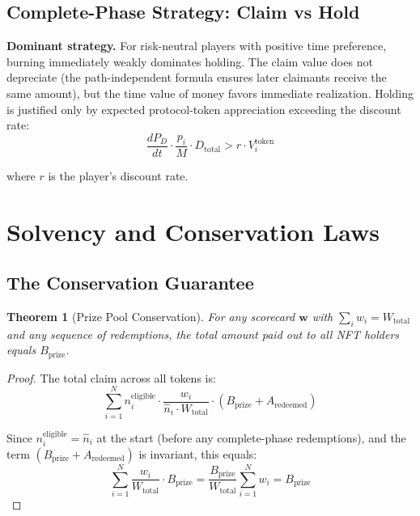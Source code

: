 \documentclass[11pt,a4paper]{article}
\newtheorem{theorem}{Theorem}
\begin{document}
\subsection{Complete-Phase Strategy: Claim vs Hold}

\textbf{Dominant strategy.} For risk-neutral players with positive time preference, burning immediately weakly dominates holding. The claim value does not depreciate (the path-independent formula ensures later claimants receive the same amount), but the time value of money favors immediate realization. Holding is justified only by expected protocol-token appreciation exceeding the discount rate:
\begin{equation}
\frac{dP_D}{dt} \cdot \frac{p_i}{M} \cdot D_{\text{total}} > r \cdot V_i^{\text{token}}
\end{equation}

where $r$ is the player's discount rate.

\section{Solvency and Conservation Laws}

\subsection{The Conservation Guarantee}

\begin{theorem}[Prize Pool Conservation]
For any scorecard $\mathbf{w}$ with $\sum_i w_i = W_{\text{total}}$ and any sequence of redemptions, the total amount paid out to all NFT holders equals $B_{\text{prize}}$.
\end{theorem}

\begin{proof}
The total claim across all tokens is:
$$\sum_{i=1}^{N} n_i^{\text{eligible}} \cdot \frac{w_i}{\hat{n}_i \cdot W_{\text{total}}} \cdot (B_{\text{prize}} + A_{\text{redeemed}})$$

Since $n_i^{\text{eligible}} = \hat{n}_i$ at the start (before any complete-phase redemptions), and the term $(B_{\text{prize}} + A_{\text{redeemed}})$ is invariant, this equals:
$$\sum_{i=1}^{N} \frac{w_i}{W_{\text{total}}} \cdot B_{\text{prize}} = \frac{B_{\text{prize}}}{W_{\text{total}}} \sum_{i=1}^{N} w_i = B_{\text{prize}}$$
\end{proof}
\end{document}

